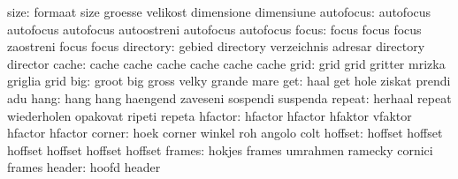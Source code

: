                      size: formaat                   size
                           groesse                   velikost
                           dimensione                dimensiune
                autofocus: autofocus                 autofocus
                           autofocus                 autoostreni
                           autofocus                 autofocus
                    focus: focus                     focus
                           focus                     zaostreni
                           focus                     focus %
                directory: gebied                    directory
                           verzeichnis               adresar
                           directory                 director
                    cache: cache                     cache
                           cache                     cache
                           cache                     cache
                     grid: grid                      grid
                           gritter                   mrizka
                           griglia                   grid
                      big: groot                     big
                           gross                     velky
                           grande                    mare
                      get: haal                      get
                           hole                      ziskat
                           prendi                    adu
                     hang: hang                      hang
                           haengend                  zaveseni
                           sospendi                  suspenda
                   repeat: herhaal                   repeat
                           wiederholen               opakovat
                           ripeti                    repeta
                  hfactor: hfactor                   hfactor
                           hfaktor                   vfaktor
                           hfactor                   hfactor  %
                   corner: hoek                      corner
                           winkel                    roh
                           angolo                    colt
                  hoffset: hoffset                   hoffset
                           hoffset                   hoffset
                           hoffset                   hoffset %
                   frames: hokjes                    frames
                           umrahmen                  ramecky
                           cornici                   frames
                   header: hoofd                     header
